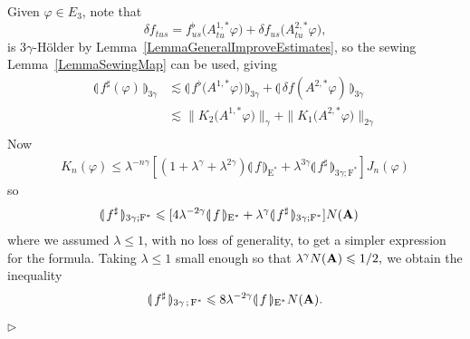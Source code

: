 \documentclass[11pt,a4paper]{amsart}
\renewcommand{\leq}{\leqslant}
\numberwithin{equation}{section} %
\newenvironment{Dem}{%
    \begin{list}{\hspace{0.5cm}{\sc Proof --}}{%
        \setlength{\topsep}{0pt}%
        \setlength{\leftmargin}{0pt}%
        \setlength{\rightmargin}{0pt}%
        \setlength{\listparindent}{0pt}%
        \setlength{\itemindent}{0pt}%
        \setlength{\parsep}{0pt}%
        \addtolength{\leftmargin}{20pt}%
        \addtolength{\rightmargin}{0pt}%
    } \item }{\hfill{\space $\rhd$}\end{list}\smallskip}
\begin{document}
\begin{Dem}
Given $\varphi\in E_3$, note that
$$
\delta f_{tus} = f^\flat_{us}\big(A^{1,*}_{tu}\varphi\big) + \delta f_{us}\big(A^{2,*}_{tu}\varphi\big),
$$
is $3\gamma$-H\"older by Lemma~\ref{LemmaGeneralImproveEstimates}, so the sewing Lemma~\ref{LemmaSewingMap} can be used, giving
\begin{equation*}
\begin{split}
\llparenthesis\, f^\sharp(\varphi)\,\rrparenthesis_{3\gamma} 
&\lesssim \llparenthesis\,  f^\flat \big(A^{1,*}\varphi\big) \,\rrparenthesis_{3\gamma} +  \llparenthesis\,  \delta f (A^{2,*}\varphi) \,\rrparenthesis_{3\gamma}\\
&\lesssim  \|  K_2\big(A^{1,*}\varphi\big) \|_\gamma +  \|  K_1\big(A^{2,*}\varphi\big)\|_{2\gamma}\\
\end{split}
\end{equation*}
Now
\begin{equation*}
\begin{split}
K_n(\varphi) \leq \lambda^{-n\gamma}[(1+\lambda^\gamma+\lambda^{2\gamma})\llparenthesis\, f\,\rrparenthesis_{\textrm{E}^*} + \lambda^{3\gamma} \llparenthesis\, f^\sharp\,\rrparenthesis_{3\gamma;\textrm{F}^*}] J_n(\varphi)
\end{split}
\end{equation*}
so
\begin{equation*}
\begin{split}
 \llparenthesis\, f^\sharp\,\rrparenthesis_{3\gamma;\textrm{F}^*}
&\leq  [4 \lambda^{-2\gamma}\llparenthesis\, f\,\rrparenthesis_{\textrm{E}^*} + \lambda^{\gamma} \llparenthesis\, f^\sharp\,\rrparenthesis_{3\gamma;\textrm{F}^*}] N({\bfA})
\end{split}
\end{equation*}
where we assumed  $\lambda \leq 1$, with no loss of generality, to get a simpler expression for the formula. 
Taking $\lambda\leq 1$ small enough so that
$
\lambda^{\gamma} N({\bfA}) \leq 1/2,
$
we obtain the  inequality
$$
\llparenthesis\, f^\sharp \,\rrparenthesis_{3\gamma\,;\,\textrm{F}^*} \leq  8 \lambda^{-2\gamma} 
\llparenthesis\, f\,\rrparenthesis_{\textrm{E}^*} N({\bfA}).
$$
\end{Dem}

\bigskip
\end{document}
